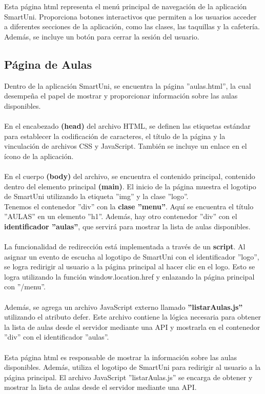 \documentclass[12pt]{report}
\begin{document}
Esta página html representa el menú principal de navegación de la aplicación SmartUni. Proporciona botones interactivos que permiten a los usuarios acceder a diferentes secciones de la aplicación, como las clases, las taquillas y la cafetería. Además, se incluye un botón para cerrar la sesión del usuario.


\subsection{Página de Aulas}
Dentro de la aplicación SmartUni, se encuentra la página ''aulas.html'', la cual desempeña el papel de mostrar y proporcionar información sobre las aulas disponibles.
\\\\
En el encabezado \textbf{(head)} del archivo HTML, se definen las etiquetas estándar para establecer la codificación de caracteres, el título de la página y la vinculación de archivos CSS y JavaScript. También se incluye un enlace en el ícono de la aplicación.
\\\\
En el cuerpo \textbf{(body)} del archivo, se encuentra el contenido principal, contenido dentro del elemento principal \textbf{(main)}. El inicio de la página muestra el logotipo de SmartUni utilizando la etiqueta ''img'' y la clase ''logo''.
\\
Tenemos el contenedor ''div'' con la \textbf{clase ''menu''}. Aquí se encuentra el título ''AULAS'' en un elemento ''h1''. Además, hay otro contenedor ''div'' con el \textbf{identificador ''aulas''}, que servirá para mostrar la lista de aulas disponibles.
\\\\
La funcionalidad de redirección está implementada a través de un \textbf{script}. Al asignar un evento de escucha al logotipo de SmartUni con el identificador ''logo'', se logra redirigir al usuario a la página principal al hacer clic en el logo. Esto se logra utilizando la función window.location.href y enlazando la página principal con ''/menu''.
\\\\
Además, se agrega un archivo JavaScript externo llamado \textbf{''listarAulas.js''} utilizando el atributo defer. Este archivo contiene la lógica necesaria para obtener la lista de aulas desde el servidor mediante una API y mostrarla en el contenedor ''div'' con el identificador ''aulas''.
\\\\
Esta página html es responsable de mostrar la información sobre las aulas disponibles. Además, utiliza el logotipo de SmartUni para redirigir al usuario a la página principal. El archivo JavaScript ''listarAulas.js'' se encarga de obtener y mostrar la lista de aulas desde el servidor mediante una API.
 
\end{document}
